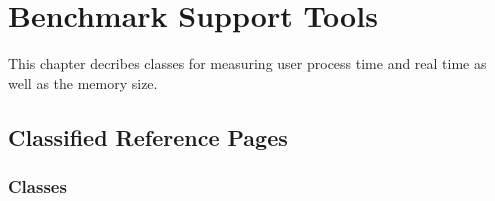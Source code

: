 
\chapter{Benchmark Support Tools}


This chapter decribes classes for measuring user process time and real time
as well as the memory size.


\section{Classified Reference Pages}

\subsection*{Classes}
\\
\\
\\
